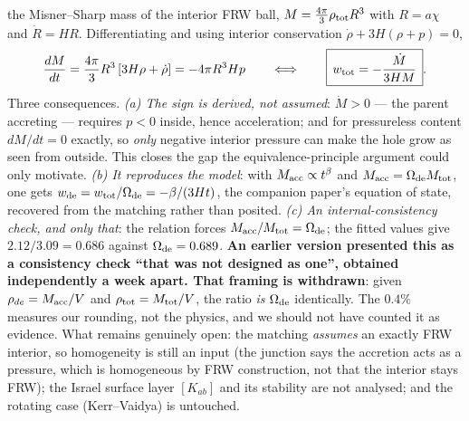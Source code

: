 \documentclass[11pt]{article}
\begin{document}
the Misner--Sharp mass of the interior FRW ball, $M = \tfrac{4\pi}{3}\rho_{\rm tot}R^3$ with
$R = a\chi$ and $\dot R = HR$. Differentiating and using interior conservation
$\dot\rho + 3H(\rho+p) = 0$,
\begin{equation}
\frac{dM}{dt} = \frac{4\pi}{3}R^3\left[3H\rho + \dot\rho\right] = -4\pi R^3 H p
\qquad \Longleftrightarrow \qquad
\boxed{\,w_{\rm tot} = -\frac{\dot M}{3HM}\,}.
\end{equation}
Three consequences. \emph{(a) The sign is derived, not assumed}: $\dot M > 0$ --- the parent accreting
--- requires $p < 0$ inside, hence acceleration; and for pressureless content $dM/dt = 0$ exactly, so
\emph{only} negative interior pressure can make the hole grow as seen from outside. This closes the
gap the equivalence-principle argument could only motivate. \emph{(b) It reproduces the model}: with
$M_{\rm acc} \propto t^\beta$ and $M_{\rm acc} = \Omega_{\rm de}M_{\rm tot}$, one gets
$w_{\rm de} = w_{\rm tot}/\Omega_{\rm de} = -\beta/(3Ht)$, the companion paper's equation of state,
recovered from the matching rather than posited. \emph{(c) An internal-consistency check, and only that}: the relation forces $M_{\rm acc}/M_{\rm tot} = \Omega_{\rm de}$; the fitted values give $2.12/3.09 = 0.686$ against $\Omega_{\rm de} = 0.689$. \textbf{An earlier version presented this as a consistency check ``that was not designed as one'', obtained independently a week apart. That framing is withdrawn}: given $\rho_{de} = M_{\rm acc}/V$ and $\rho_{\rm tot} = M_{\rm tot}/V$, the ratio \emph{is} $\Omega_{\rm de}$ identically. The $0.4\%$ measures our rounding, not the physics, and we should not have counted it as evidence. What remains genuinely open: the matching \emph{assumes} an exactly FRW
interior, so homogeneity is still an input (the junction says the accretion acts as a pressure, which
is homogeneous by FRW construction, not that the interior stays FRW); the Israel surface layer
$[K_{ab}]$ and its stability are not analysed; and the rotating case (Kerr--Vaidya) is untouched.
\end{document}
